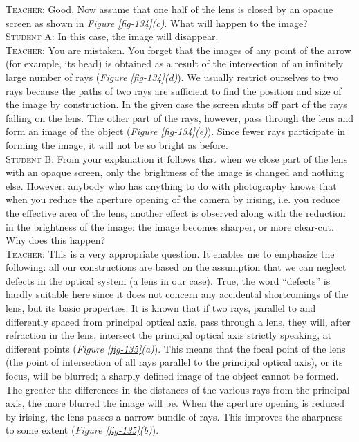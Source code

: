 \documentclass[a4paper,sfsidenotes]{tufte-book}
\begin{document}
\textsc{Teacher:} Good. Now assume that one half of the lens is closed by an opaque screen as shown in \emph{Figure \ref{fig-134}(c)}. What will happen to the image?
\\
\textsc{Student A:} In this case, the image will disappear.
\\
\textsc{Teacher:} You are mistaken. You forget that the images of any point of the arrow (for example, its head) is obtained as a result of the intersection of an infinitely large number of rays (\emph{Figure \ref{fig-134}(d)}). We usually restrict ourselves to two rays because the paths of two rays are sufficient to find the position and size of the image by construction. In the given case the screen shuts off part of the rays falling on the lens. The other part of the rays, however, pass through the lens and form an image of the object (\emph{Figure \ref{fig-134}(e)}). Since fewer rays participate in forming the image, it will not be so bright as before.
\\
\textsc{Student B:} From your explanation it follows that when we close part of the lens with an opaque screen, only the brightness of the image is changed and nothing else. However, anybody who has anything to do with photography knows that when you reduce the aperture opening of the camera by irising, i.e. you reduce the effective area of the lens, another effect is observed along with the reduction in the brightness of the image: the image becomes sharper, or more clear-cut. Why does this happen?
\\
\textsc{Teacher:} This is a very appropriate question. It enables me to emphasize the following: all our constructions are based on the assumption that we can neglect defects in the optical system (a lens in our case). True, the word ``defects'' is hardly suitable here since it does not concern any accidental shortcomings of the lens, but its basic properties. It is known that if two rays, parallel to and differently spaced from principal optical axis, pass through a lens, they will, after refraction in the lens, intersect the principal optical axis strictly speaking, at different points (\emph{Figure \ref{fig-135}(a)}). This means that the focal point of the lens (the point of intersection of all rays parallel to the principal optical axis), or its focus, will be blurred; a sharply defined image of the object cannot be formed. The greater the differences in the distances of the various rays from the principal axis,  the more blurred the image will be. When the aperture opening is reduced by irising, the lens passes a narrow bundle of rays. This improves the sharpness to some extent (\emph{Figure \ref{fig-135}(b)}).
\end{document}
